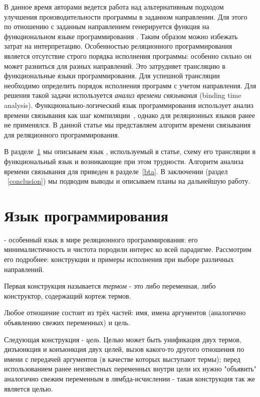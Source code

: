 \documentclass[conference]{IEEEtran}
\begin{document}
В данное время авторами ведется работа над альтернативным подходом улучшения производительности программы в заданном направлении. 
Для этого по отношению с заданным направлением генерируется функция на функциональном языке программирования \haskell{}. 
Таким образом можно избежать затрат на интерпретацию. 
Особенностью реляционного программирования является отсутствие строго порядка исполнения программы: особенно сильно он может разниться для разных направлений.
Это затрудняет трансляцию в функциональные языки программирования. 
Для успешной трансляции необходимо определить порядок исполнения программ с учетом направления. 
Для решения такой задачи используется \emph{анализ времени связывания} (binding time analysis). 
Функционально-логический язык программирования \mercury использует анализ времени связывания как шаг компиляции~\cite{vanhoof2004binding}, однако для реляционных языков ранее не применялся.
В данной статье мы представляем алгоритм времени связывания для реляционного программирования. 

В разделе~\ref{miniKanren} мы описываем язык \miniKanren{}, используемый в статье, схему его трансляции в функциональный язык и возникающие при этом трудности. 
Алгоритм анализа времени связывания для \miniKanren{} приведен в разделе~\ref{bta}. 
В заключении (раздел ~\ref{conclusion}) мы подводим выводы и описываем планы на дальнейшую работу. 

\section{Язык программирования \miniKanren{}}\label{miniKanren}

\miniKanren - особенный язык в мире реляционного программирования: его минималистичность и чистота породили интерес ко всей парадигме. Рассмотрим его подробнее: конструкции и примеры исполнения при выборе различных направлений.

Первая конструкция называется \emph{термом} - это либо переменная, либо конструктор, содержащий кортеж термов.

Любое отношение состоит из трёх частей: имя, имена аргументов (аналогично объявлению свежих переменных) и цель.

Следующая конструкция - \emph{цель}. Целью может быть унификация двух термов, дизъюнкция и конъюнкция двух целей, вызов какого-то другого отношения по имени с передачей аргументов (в качестве которых выступают термы); перед использованием ранее неизвестных переменных внутри цели их нужно "объявить" аналогично свежим переменным в лямбда-исчислении - такая конструкция так же является целью.
\end{document}
